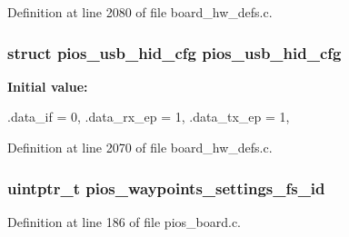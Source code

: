 \-Definition at line 2080 of file board\-\_\-hw\-\_\-defs.\-c.

\hypertarget{group___quanton_ga3665f6d3a2cccc431b55b9432291e94c}{
\subsubsection[{pios\-\_\-usb\-\_\-hid\-\_\-cfg}]{\setlength{\rightskip}{0pt plus 5cm}struct {\bf pios\-\_\-usb\-\_\-hid\-\_\-cfg} {\bf pios\-\_\-usb\-\_\-hid\-\_\-cfg}}}\label{group___quanton_ga3665f6d3a2cccc431b55b9432291e94c}
{\bfseries \-Initial value\-:}
\begin{DoxyCode}
 {
        .data_if = 0,
        .data_rx_ep = 1,
        .data_tx_ep = 1,
}
\end{DoxyCode}


\-Definition at line 2070 of file board\-\_\-hw\-\_\-defs.\-c.

\hypertarget{group___quanton_ga4b04979e5fb31eaa66088178605835cd}{
\subsubsection[{pios\-\_\-waypoints\-\_\-settings\-\_\-fs\-\_\-id}]{\setlength{\rightskip}{0pt plus 5cm}uintptr\-\_\-t {\bf pios\-\_\-waypoints\-\_\-settings\-\_\-fs\-\_\-id}}}\label{group___quanton_ga4b04979e5fb31eaa66088178605835cd}


\-Definition at line 186 of file pios\-\_\-board.\-c.

